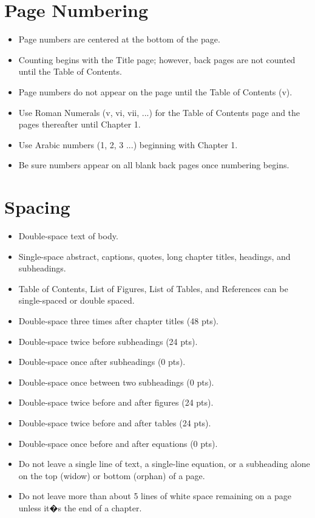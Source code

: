 \section{Page Numbering}
\begin{itemize}
\item	Page numbers are centered at the bottom of the page.
\item	Counting begins with the Title page; however, back pages are not counted until the Table of Contents.
\item	Page numbers do not appear on the page until the Table of Contents (v).
\item	Use Roman Numerals (v, vi, vii, ...) for the Table of Contents page and the pages thereafter until Chapter 1.  
\item	Use Arabic numbers (1, 2, 3 ...) beginning with Chapter 1. 
\item	Be sure numbers appear on all blank back pages once numbering begins.
\end{itemize}

\section{Spacing}
\begin{itemize}
\item	Double-space text of body.
\item	Single-space abstract, captions, quotes, long chapter titles, headings, and subheadings.
\item	Table of Contents, List of Figures, List of Tables, and References can be single-spaced or double spaced.
\item	Double-space three times after chapter titles (48 pts).
\item	Double-space twice before subheadings (24 pts). 
\item	Double-space once after subheadings (0 pts). 
\item	Double-space once between two subheadings (0 pts). 
\item	Double-space twice before and after figures (24 pts).
\item	Double-space twice before and after tables (24 pts).
\item	Double-space once before and after equations (0 pts).
\item	Do not leave a single line of text, a single-line equation, or a subheading alone on the top (widow) or bottom (orphan) of a page.
\item	Do not leave more than about 5 lines of white space remaining on a page unless it�s the end of a chapter.
\end{itemize}

